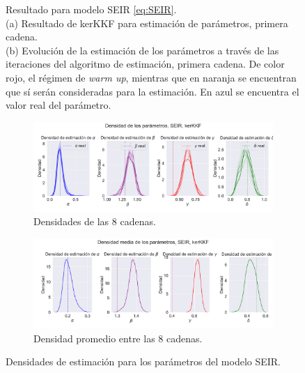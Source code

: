 \begin{figure}[h]
\begin{subfigure}[b]{0.49\textwidth}
         \caption{}
         \label{fig:nonlinear_filters_seir_params_evolution}
    \end{subfigure}
    \caption{Resultado para modelo SEIR \eqref{eq:SEIR}. \\
    (a) Resultado de kerKKF para estimación de parámetros, primera cadena. \\
    (b) Evolución de la estimación de los parámetros a través de las iteraciones del algoritmo de estimación, primera cadena. De color rojo, el régimen de \textit{warm up}, mientras que en naranja se encuentran que sí serán consideradas para la estimación. En azul se encuentra el valor real del parámetro.}
    \label{fig:SEIR}
\end{figure}

\begin{figure}[h]
    \centering
    \begin{subfigure}[b]{0.8\textwidth}
        \centering \includegraphics[width=0.9\linewidth]{img/content/chapter4/nonlinear_filters_seir_params_density.pdf}
    \caption{Densidades de las 8 cadenas.}
    \label{fig:nonlinear_filters_seir_params_density}
    \end{subfigure}
    \begin{subfigure}[b]{0.8\textwidth}
        \centering \includegraphics[width=0.9\linewidth]{img/content/chapter4/nonlinear_filters_seir_params_density_mean.pdf}
    \caption{Densidad promedio entre las 8 cadenas.}
    \label{fig:nonlinear_filters_seir_params_density_mean}
    \end{subfigure}
    \caption{Densidades de estimación para los parámetros del modelo SEIR.}
\end{figure}

